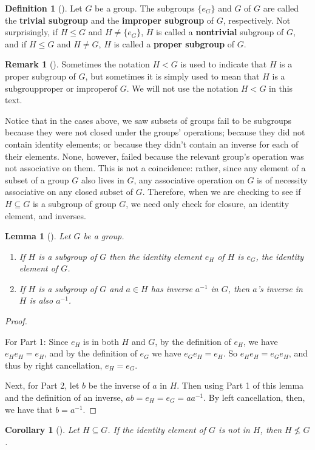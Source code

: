 \documentclass[10pt,]{book}
\newcommand{\terminology}[1]{\textbf{#1}}
\theoremstyle{plain}
\newtheorem{corollary}[theorem]{Corollary}
\newtheorem{lemma}[theorem]{Lemma}
\theoremstyle{definition}
\newtheorem{definition}[theorem]{Definition}
\theoremstyle{definition}
\newtheorem{remark}[theorem]{Remark}
\theoremstyle{definition}
\theoremstyle{definition}
\numberwithin{equation}{section}
\newcommand{\lt}{<}
\begin{document}
\begin{definition}[{}]\label{definition-37}
Let \(G\) be a group. The subgroups \(\{e_G\}\) and \(G\) of \(G\) are called the \terminology{trivial subgroup} and the \terminology{improper subgroup} of \(G\), respectively. Not surprisingly, if \(H\leq G\) and \(H\neq \{e_G\}\), \(H\) is called a \terminology{nontrivial} subgroup of \(G\), and if \(H\leq G\) and \(H\neq G\), \(H\) is called a \terminology{proper subgroup} of \(G\).%
\end{definition}
\begin{remark}[]\label{remark-18}
Sometimes the notation \(H\lt G\) is used to indicate that \(H\) is a proper subgroup of \(G\), but sometimes it is simply used to mean that \(H\) is a subgroup\textemdash{}proper or improper\textemdash{}of \(G\). We will not use the notation \(H\lt G\) in this text.%
\end{remark}
Notice that in the cases above, we saw subsets of groups fail to be subgroups because they were not closed under the groups' operations; because they did not contain identity elements; or because they didn't contain an inverse for each of their elements. None, however, failed because the relevant group's operation was not associative on them. This is not a coincidence: rather, since any element of a subset of a group \(G\) also lives in \(G\), any associative operation on \(G\) is of necessity associative on any closed subset of \(G\). Therefore, when we are checking to see if \(H\subseteq G\) is a subgroup of group \(G\), we need only check for closure, an identity element, and inverses.%
\begin{lemma}[{}]\label{subsame}
Let \(G\) be a group. \leavevmode%
\begin{enumerate}
\item\hypertarget{li-196}{}If \(H\) is a subgroup of \(G\) then the identity element \(e_H\) of \(H\) is \(e_G\), the identity element of \(G\).%
\item\hypertarget{li-197}{}If \(H\) is a subgroup of \(G\) and \(a\in H\) has inverse \(a^{-1}\) in \(G\), then \(a\)'s inverse in \(H\) is also \(a^{-1}\).%
\end{enumerate}
%
\end{lemma}
\begin{proof}\hypertarget{proof-18}{}
For Part 1: Since \(e_H\) is in both \(H\) and \(G\), by the definition of \(e_H\), we have \(e_He_H=e_H\), and by the definition of \(e_G\) we have \(e_Ge_H=e_H\). So \(e_He_H=e_Ge_H\), and thus by right cancellation, \(e_H=e_G\).%
\par
Next, for Part 2, let \(b\) be the inverse of \(a\) in \(H\). Then using Part 1 of this lemma and the definition of an inverse, \(ab=e_H=e_G=aa^{-1}\). By left cancellation, then, we have that \(b=a^{-1}\).%
\end{proof}
\begin{corollary}[{}]\label{corollary-2}
Let \(H\subseteq G\). If the identity element of \(G\) is not in \(H\), then \(H\not\leq G\).%
\end{corollary}
\typeout{************************************************}
\typeout{************************************************}
\end{document}
